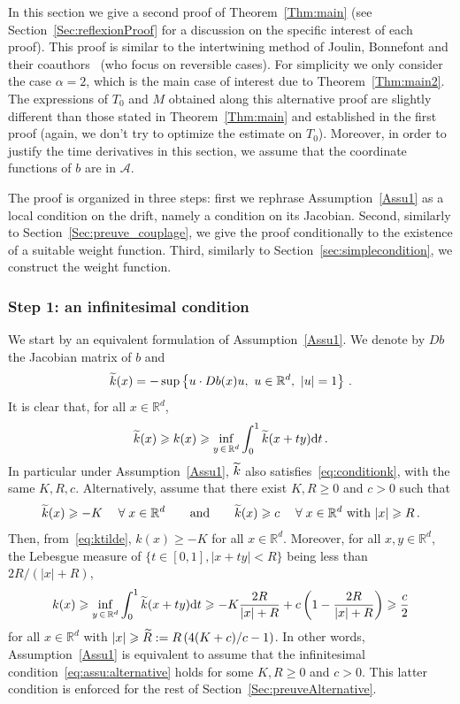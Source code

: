 \documentclass[AHL,Unicode,longabstracts,published]{cedram}
\newcommand{\R}{\mathbb R}
\newcommand{\A}{\mathcal A}
\newcommand{\dd}{\mathrm{d}}
\newcommand{\1}{\mathbbm{1}}
\newcommand{\nv}[1]{#1}
\let\oldtilde\tilde
\renewcommand*{\tilde}[1]{\mathchoice{\widetilde{#1}}{\widetilde{#1}}{\oldtilde{#1}}{\oldtilde{#1}}}
\let\oldforall\forall
\renewcommand*{\forall}{\mathrel{\oldforall}}
\newcommand{\R}{\mathbb R}
\begin{document}
In this section we give a second proof of Theorem~\ref{Thm:main} (see Section~\ref{Sec:reflexionProof} for a discussion on the specific interest of each proof). \nv{This proof is similar to the intertwining method of Joulin, Bonnefont and their coauthors~\cite{arnaudon2018intertwinings,bonnefont2022note,BonnefontJoulinMa,10.3150/12-BEJ433} (who focus on reversible cases). } For simplicity we only consider the case $\alpha=2$, which is the main case of interest due to Theorem~\ref{Thm:main2}. The expressions of $T_0$ and $M$ obtained along this alternative proof are slightly different than those stated in Theorem~\ref{Thm:main} and established in the first proof (again, we don't try to optimize the estimate on $T_0$). Moreover, in order to justify the time \nv{derivatives} in this section, we assume that the coordinate
\nv{functions} of $b$ are in $\A$.

The proof is organized in three steps: first we rephrase Assumption~\ref{Assu1} as a local condition on the drift, namely a condition on its Jacobian. Second, similarly to Section~\ref{Sec:preuve_couplage}, we give the proof conditionally to the existence of a suitable weight function. Third, similarly to Section~\ref{sec:simplecondition}, we construct the weight function.


\subsubsection{Step 1: \nv{an infinitesimal condition}} \label{sec:localCondition}

We start by an equivalent formulation of Assumption~\ref{Assu1}. We denote by $\nv{D b}$ the Jacobian matrix of $b$ and
\[
\tilde k(x) = -\sup\left\{ u\cdot \nv{D b}(x) u,\ u\in\R^d,\ |u|=1\right\}\,.
\]
It is clear that, for all $x\in\R^d$,
\begin{equation}\label{eq:ktilde}
\tilde k(x) \geqslant k(x) \geqslant \inf_{y\,\in\,\R^d} \int_{0}^1 \tilde k(x+ty) \dd t\,.
\end{equation}
In particular under Assumption~\ref{Assu1}, $\tilde k$ also satisfies~\eqref{eq:conditionk}, with the same $K,R,c$. Alternatively, assume that there exist $K,R\geqslant 0$ and $c>0$ such that
\begin{equation}\label{eq:assu:alternative}
\tilde k(x) \geqslant -K\quad \forall x\in\R^d \qquad \text{and}\qquad \tilde k(x) \geqslant c \quad \forall x\in\R^d\text{ with }|x|\geqslant R\,.
\end{equation}
Then, from~\eqref{eq:ktilde}, $k(x) \geqslant - K$ for all $x\in\R^d$. Moreover, for all $x,y\in\R^d$, the Lebesgue measure of $\{t\in[0,1], |x+ty|<R\}$ being less than $2R/(|x|+R)$,
\[
k(x) \geqslant \inf_{y\,\in\,\R^d} \int_{0}^1 \tilde k(x+ty) \dd t \geqslant -K \frac{2R}{|x|+R} + c \left( 1 - \frac{2R}{|x|+R}\right) \geqslant \frac{c}2
\]
for all $x\in \R^d$ with $|x|\geqslant \tilde R:= R\left( 4(K+c)/c-1\right)$. In other words, Assumption~\ref{Assu1} is equivalent to assume that \nv{the infinitesimal condition}~\eqref{eq:assu:alternative} holds for some $K,R\geqslant 0$ and $c>0$. This latter condition is enforced for the rest of Section~\ref{Sec:preuveAlternative}.
\end{document}

